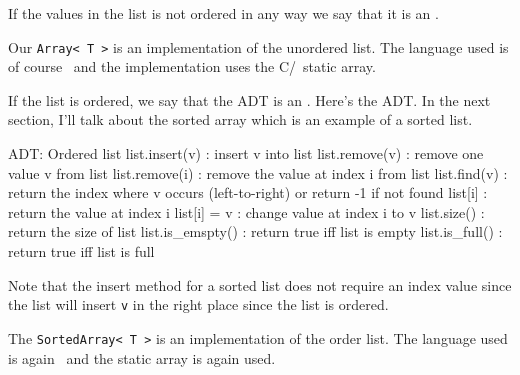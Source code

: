 If the values in the list is not ordered in any way we say that
it is
an .

Our \verb!Array< T >! is an implementation of the unordered list.
The language used is of course \cpp\ and the implementation uses
the
C/\cpp\ static array.

If the list is ordered, we say that the ADT is an .
Here's the ADT. In the next section, I'll talk about
the sorted array which is an example of a sorted list.
\begin{console}[fontsize=\footnotesize]
ADT: Ordered list
list.insert(v)   : insert v into list
list.remove(v)   : remove one value v from list
list.remove(i)   : remove the value at index i from list
list.find(v)     : return the index where v occurs (left-to-right)
                   or return -1 if not found
list[i]          : return the value at index i
list[i] = v      : change value at index i to v
list.size()      : return the size of list
list.is_emspty()  : return true iff list is empty
list.is_full()   : return true iff list is full
\end{console}

Note that the insert method for a sorted list does not require an index value since
the list will insert \verb!v! in the right place since
the list is ordered.
    
The \verb!SortedArray< T >! is an implementation of the order list.
The language used is again \cpp\ and the static array is again used.
